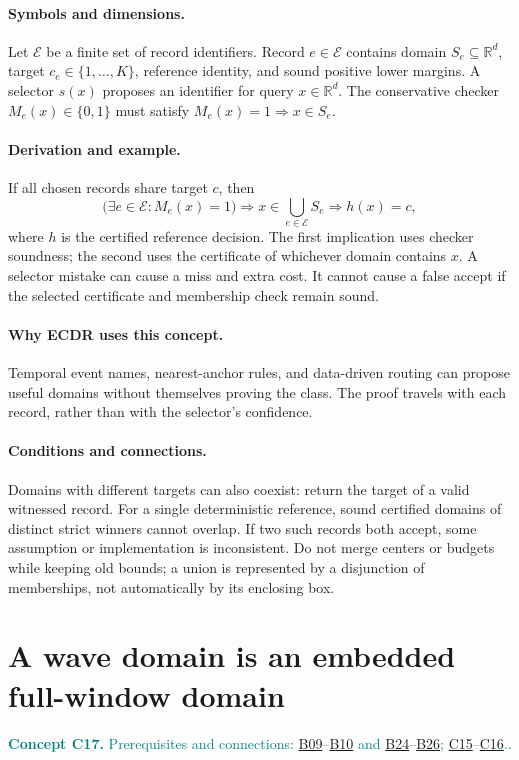 \documentclass[11pt,a4paper]{article}
\newcommand{\R}{\mathbb R}
\newcommand{\conceptid}{Front matter}
\newcommand{\concept}[3]{\clearpage\renewcommand{\conceptid}{#1}%
\section{#2}\label{concept:#1}%
\textcolor{teal}{\textbf{Concept #1.} Prerequisites and connections: #3.}\par
\typeout{ECDR-CONCEPT-START #1 PAGE=\thepage}}
\begin{document}
\paragraph{Symbols and dimensions.}
Let $\mathcal E$ be a finite set of record identifiers. Record $e\in\mathcal E$ contains domain $S_e\subseteq\R^d$, target $c_e\in\{1,\ldots,K\}$, reference identity, and sound positive lower margins. A selector $s(x)$ proposes an identifier for query $x\in\R^d$. The conservative checker $M_e(x)\in\{0,1\}$ must satisfy $M_e(x)=1\Rightarrow x\in S_e$.
\paragraph{Derivation and example.}
If all chosen records share target $c$, then
\[
 \bigl(\exists e\in\mathcal E:M_e(x)=1\bigr)
 \Longrightarrow x\in\bigcup_{e\in\mathcal E}S_e
 \Longrightarrow h(x)=c,
\]
where $h$ is the certified reference decision. The first implication uses checker soundness; the second uses the certificate of whichever domain contains $x$. A selector mistake can cause a miss and extra cost. It cannot cause a false accept if the selected certificate and membership check remain sound.
\paragraph{Why ECDR uses this concept.}
Temporal event names, nearest-anchor rules, and data-driven routing can propose useful domains without themselves proving the class. The proof travels with each record, rather than with the selector's confidence.
\paragraph{Conditions and connections.}
Domains with different targets can also coexist: return the target of a valid witnessed record. For a single deterministic reference, sound certified domains of distinct strict winners cannot overlap. If two such records both accept, some assumption or implementation is inconsistent. Do not merge centers or budgets while keeping old bounds; a union is represented by a disjunction of memberships, not automatically by its enclosing box.
\par\label{endconcept:C16}

\concept{C17}{A wave domain is an embedded full-window domain}{\hyperref[concept:B09]{B09}--\hyperref[concept:B10]{B10} and \hyperref[concept:B24]{B24}--\hyperref[concept:B26]{B26}; \hyperref[concept:C15]{C15}--\hyperref[concept:C16]{C16}.}
\end{document}
